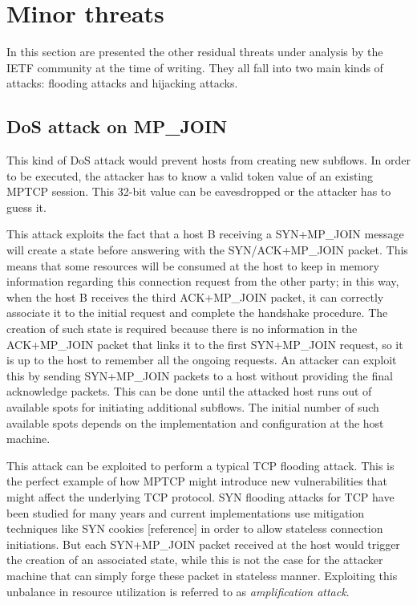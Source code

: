 \section{Minor threats}
In this section are presented the other residual threats under analysis by the IETF community at the time of writing. They all fall into two main kinds of attacks: flooding attacks and hijacking attacks. 

\subsection{DoS attack on MP\_JOIN}
This kind of DoS attack would prevent hosts from creating new subflows. In order to be executed, the attacker has to know a valid token value of an existing MPTCP session. This 32-bit value can be eavesdropped or the attacker has to guess it.

This attack exploits the fact that a host B receiving a SYN+MP\_JOIN message will create a state before answering with the SYN/ACK+MP\_JOIN packet. This means that some resources will be consumed at the host to keep in memory information regarding this connection request from the other party; in this way, when the host B receives the third ACK+MP\_JOIN packet, it can correctly associate it to the initial request and complete the handshake procedure. The creation of such state is required because there is no information in the ACK+MP\_JOIN packet that links it to the first SYN+MP\_JOIN request, so it is up to the host to remember all the ongoing requests.
An attacker can exploit this by sending SYN+MP\_JOIN packets to a host without providing the final acknowledge packets. This can be done until the attacked host runs out of available spots for initiating additional subflows. The initial number of such available spots depends on the implementation and configuration at the host machine. 

This attack can be exploited to perform a typical TCP flooding attack. This is the perfect example of how MPTCP might introduce new vulnerabilities that might affect the underlying TCP protocol. 
SYN flooding attacks for TCP have been studied for many years and current implementations use mitigation techniques like SYN cookies [reference] in order to allow stateless connection initiations. But each SYN+MP\_JOIN packet received at the host would trigger the creation of an associated state, while this is not the case for the attacker machine that can simply forge these packet in stateless manner. Exploiting this unbalance in resource utilization is referred to as \textit{amplification attack}.

